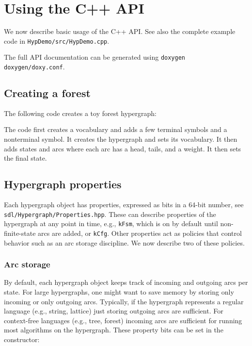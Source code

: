 \documentclass[12pt]{article}
\newcommand{\yellowlisting}[1]{%
  }
\newcommand{\code}[1]{\texttt{#1}}
\begin{document}
\section{Using the C++ API}

We now describe basic usage of the C++ API. See also the complete
example code in \texttt{HypDemo/src/HypDemo.cpp}.

The full API documentation can be generated using \code{doxygen doxygen/doxy.conf}.

\subsection{Creating a forest}\label{sec:creating-forest}

The following code creates a toy forest hypergraph:

\lstset{
  language=C++,
  numbers=left
}
\yellowlisting{CreateForest.hpp}

The code first creates a vocabulary and adds a few terminal symbols
and a nonterminal symbol. It creates the hypergraph and sets its
vocabulary. It then adds states and arcs where each arc has a head,
tails, and a weight. It then sets the final state.

\subsection{Hypergraph properties}

Each hypergraph object has properties, expressed as bits in a 64-bit
number, see \texttt{sdl/Hypergraph/Properties.hpp}. These can describe
properties of the hypergraph at any point in time, e.g.,
\texttt{kFsm}, which is on by default until non-finite-state arcs are
added, or \texttt{kCfg}. Other properties act as policies that control
behavior such as an arc storage discipline. We now describe two of
these policies.

\subsubsection{Arc storage}

By default, each hypergraph object keeps track of incoming and
outgoing arcs per state. For large hypergraphs, one might want to save
memory by storing only incoming or only outgoing arcs. Typically, if
the hypergraph represents a regular language (e.g., string, lattice)
just storing outgoing arcs are sufficient. For context-free languages
(e.g., tree, forest) incoming arcs are sufficient for running most
algorithms on the hypergraph. These property bits can be set in the
constructor:
\end{document}
